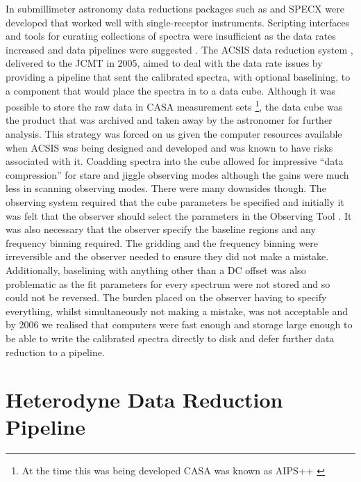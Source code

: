 \documentclass[final,authoryear,5p,times,twocolumn]{elsarticle}
\begin{document}
In submillimeter astronomy data reductions packages such as
 and
SPECX \citep{SPECX} were developed that worked well with
single-receptor instruments. Scripting interfaces and tools for
curating collections of spectra were insufficient as the data rates
increased and data pipelines were suggested
\citep[e.g.,][]{1995ASPC...75..117W}. The ACSIS data reduction system
\citep{2000ASPC..216..502L,2000SPIE.4015..114H}, delivered to the JCMT
in 2005, aimed to deal with the data rate issues by providing a
pipeline that sent the calibrated spectra, with optional baselining,
to a component that would place the spectra in to a data
cube. Although it was possible to store the raw data in CASA
measurement sets \citep{2012ASPC..461..849P}\footnote{At the time this
  was being developed CASA was known as AIPS++
  \citep{2004ASPC..314..468M}}, the data cube was the product that was
archived and taken away by the astronomer for further analysis. This
strategy was forced on us given the computer resources available when
ACSIS was being designed and developed and was known to have risks
associated with it. Coadding spectra into the cube allowed for
impressive ``data compression'' for stare and jiggle observing modes
although the gains were much less in scanning observing modes. There
were many downsides though. The observing system required that the
cube parameters be specified and initially it was felt that the
observer should select the parameters in the Observing Tool
\citep{2002ASPC..281..453F}. It was also necessary that the observer
specify the baseline regions and any frequency binning required. The
gridding and the frequency binning were irreversible and the observer
needed to ensure they did not make a mistake. Additionally, baselining
with anything other than a DC offset was also problematic as the fit
parameters for every spectrum were not stored and so could not be
reversed. The burden placed on the observer having to specify
everything, whilst simultaneously not making a mistake, was not
acceptable and by 2006 we realised that computers were fast enough and
storage large enough to be able to write the calibrated spectra
directly to disk and defer further data reduction to a pipeline.

\section{Heterodyne Data Reduction Pipeline}
\end{document}
